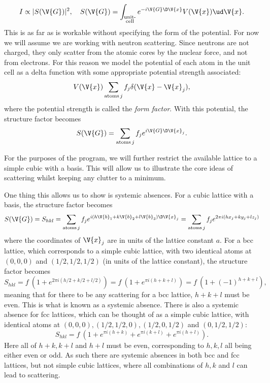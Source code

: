 \documentclass[main.tex]{subfiles}
\begin{document}
	\begin{equation}
		I \propto |S(\V{G})|^2, \quad S(\V{G}) = \int_{\substack{\text{unit-} \\\text{cell}}} e^{-i \V{G} \D \V{x}} V(\V{x}) \ud \V{x}.
	\end{equation}
	This is as far as is workable without specifying the form of the potential. For now we will assume we are working with neutron scattering. Since neutrons are not charged, they only scatter from the atomic cores by the nuclear force, and not from electrons. For this reason we model the potential of each atom in the unit cell as a delta function with some appropriate potential strength associated:
	\begin{equation}\label{eq:Scat_neutron_pot}
		V(\V{x}) \sum_{\text{atoms} \,j} f_j \delta(\V{x}-\V{x}_j),
	\end{equation}
	where the potential strength is called the \textit{form factor}. With this potential, the structure factor becomes
	\begin{equation}\label{eq:Scat_struct}
		S(\V{G}) = \sum_{\text{atoms} \,j} f_j e^{i \V{G} \D \V{x}_j}.
	\end{equation}
	
	For the purposes of the program, we will further restrict the available lattice to a simple cubic with a basis. This will allow us to illustrate the core ideas of scattering whilst keeping any clutter to a minimum.
	
	One thing this allows us to show is systemic absences. For a cubic lattice with a basis, the structure factor becomes
	\begin{equation}\label{eq:Scat_struct_ortho}
		S(\V{G}) = S_{hkl} = \sum_{\text{atoms}\, j} f_j e^{i (h\V{b}_1 + k\V{b}_2 + l\V{b}_3) \D \V{x}_j} = \sum_{\text{atoms}\, j} f_j e^{2\pi i (hx_j + ky_j + lz_j)}
	\end{equation}
	where the coordinates of $ \V{x}_j $ are in units of the lattice constant $ a $. For a bcc lattice, which corresponds to a simple cubic lattice, with two identical atoms at $ (0,0,0) $ and $ (1/2, 1/2, 1/2) $ (in units of the lattice constant), the structure factor becomes
	\begin{equation}
		S_{hkl} = f\ (1 + e^{2\pi i (h/2 + k/2 + l/2)}) = f\ (1 + e^{\pi i (h+k+l)}) = f \ (1+ (-1)^{h+k+l}),
	\end{equation}
	meaning that for there to be any scattering for a bcc lattice, $ h+k+l $ must be even. This is what is known as a systemic absence. There is also a systemic absence for fcc lattices, which can be thought of as a simple cubic lattice, with identical atoms at $ (0,0,0), (1/2, 1/2, 0), (1/2, 0, 1/2) $ and $ (0, 1/2, 1/2) $:
	\begin{equation}
		S_{hkl} = f\ (1 + e^{\pi i (h+k)} + e^{\pi i (k+l)} + e^{\pi i (h+l)}).
	\end{equation}
	Here all of $ h+k, k+l $ and $ h+l $ must be even, corresponding to $ h,k,l $ all being either even or odd. As such there are systemic absences in both bcc and fcc lattices, but not simple cubic lattices, where all combinations of $ h,k $ and $ l $ can lead to scattering.
	
\end{document}

